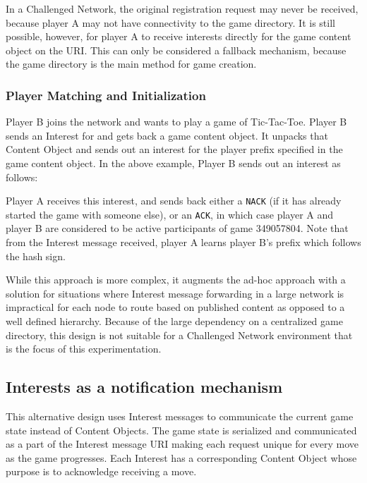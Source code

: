\documentclass[a4paper,12pt]{report}      %
\begin{document}
In a Challenged Network, the original registration request may never be received, because player A may not have
connectivity to the game directory. It is still possible, however, for player A to receive interests directly for the
game content object on the \texttt{} URI. This can only be
considered a fallback mechanism, because the game directory is the main method for game creation.

\subsubsection{Player Matching and Initialization}

Player B joins the network and wants to play a game of Tic-Tac-Toe. Player B sends an Interest for
\texttt{} and gets back a game content object. It unpacks that Content
Object and sends out an interest for the player prefix specified in the game content object. In the above
example, Player B sends out an interest as follows:

\texttt{}

Player A receives this interest, and sends back either a \verb!NACK! (if it has already started the game with
someone else), or an \verb!ACK!, in which case player A and player B are considered to be active participants
of game 349057804. Note that from the Interest message received, player A learns player B's prefix
which follows the hash sign.

While this approach is more complex, it augments the ad-hoc approach with a solution for situations
where Interest message forwarding in a large network is impractical for each node to route based on
published content as opposed to a well defined hierarchy. Because of the large dependency on a centralized game directory, 
this design is not suitable for a Challenged Network environment that is the focus of this experimentation. 

\subsection{Interests as a notification mechanism}

This alternative design uses Interest messages to communicate the current game state instead of Content Objects. The game state is serialized and communicated as a part of the Interest message URI making each request unique for every move as the game progresses. Each Interest has a corresponding Content Object whose purpose is to acknowledge receiving a move. 
\end{document}
